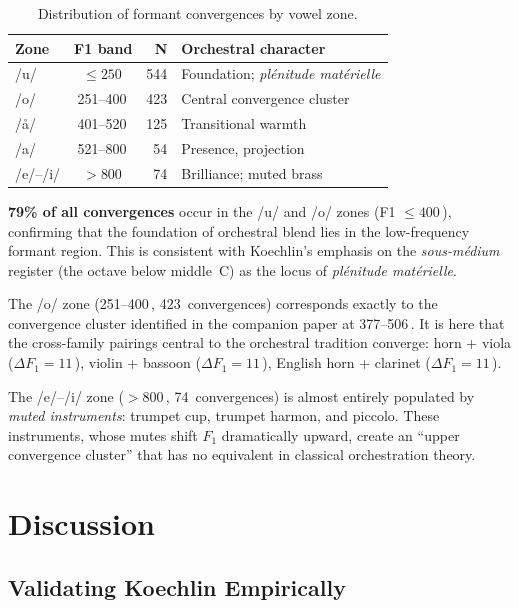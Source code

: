 \documentclass[journal]{IEEEtran}
\newcommand{\Hz}{\,\text{Hz}}
\begin{document}
\begin{table}[!t]
\centering
\caption{Distribution of formant convergences by vowel zone.}
\label{tab:zones}
\begin{tabular}{@{}lcrl@{}}
\toprule
\textbf{Zone} & \textbf{F1 band} & \textbf{N} & \textbf{Orchestral character} \\
\midrule
/u/       & $\leq 250$\Hz    & 544 & Foundation; \textit{plénitude matérielle} \\
/o/       & 251--400\Hz      & 423 & Central convergence cluster \\
/\aa/     & 401--520\Hz      & 125 & Transitional warmth \\
/a/       & 521--800\Hz      & 54  & Presence, projection \\
/e/--/i/  & $> 800$\Hz       & 74  & Brilliance; muted brass \\
\bottomrule
\end{tabular}
\end{table}

\textbf{79\% of all convergences} occur in the /u/ and /o/ zones (F1 $\leq 400$\Hz), confirming that the foundation of orchestral blend lies in the low-frequency formant region. This is consistent with Koechlin's emphasis on the \textit{sous-médium} register (the octave below middle~C) as the locus of \textit{plénitude matérielle}.

The /o/ zone (251--400\Hz, 423~convergences) corresponds exactly to the convergence cluster identified in the companion paper at 377--506\Hz. It is here that the cross-family pairings central to the orchestral tradition converge: horn + viola ($\Delta F_1 = 11$\Hz), violin + bassoon ($\Delta F_1 = 11$\Hz), English horn + clarinet ($\Delta F_1 = 11$\Hz).

The /e/--/i/ zone ($> 800$\Hz, 74~convergences) is almost entirely populated by \emph{muted instruments}: trumpet cup, trumpet harmon, and piccolo. These instruments, whose mutes shift $F_1$ dramatically upward, create an ``upper convergence cluster'' that has no equivalent in classical orchestration theory.

\section{Discussion}
\label{sec:discussion}

\subsection{Validating Koechlin Empirically}
\end{document}
